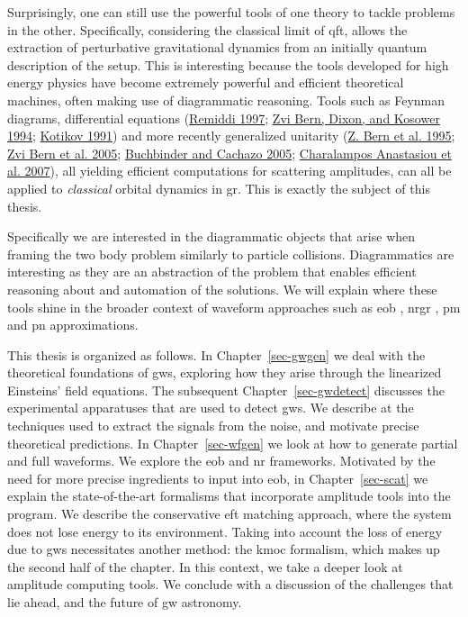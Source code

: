 \documentclass[
  11pt,
  a4paper,
  DIV=11,
  numbers=noendperiod,
  oneside]{scrreprt}
\DeclareRobustCommand{\[}{\begin{equation}}
\DeclareRobustCommand{\]}{\end{equation}}
\begin{document}
Surprisingly, one can still use the powerful tools of one theory to
tackle problems in the other. Specifically, considering the classical
limit of \gls{qft}, allows the extraction of perturbative gravitational
dynamics from an initially quantum description of the setup. This is
interesting because the tools developed for high energy physics have
become extremely powerful and efficient theoretical machines, often
making use of diagrammatic reasoning. Tools such as Feynman diagrams,
differential equations (\protect\hyperlink{ref-Remiddi:1997ny}{Remiddi
1997}; \protect\hyperlink{ref-Bern:1993kr}{Zvi Bern, Dixon, and Kosower
1994}; \protect\hyperlink{ref-Kotikov:1990kg}{Kotikov 1991}) and more
recently generalized unitarity (\protect\hyperlink{ref-Bern:1994cg}{Z.
Bern et al. 1995}; \protect\hyperlink{ref-Bern:2004ky}{Zvi Bern et al.
2005}; \protect\hyperlink{ref-Buchbinder:2005wp}{Buchbinder and Cachazo
2005}; \protect\hyperlink{ref-Anastasiou:2006jv}{Charalampos Anastasiou
et al. 2007}), all yielding efficient computations for scattering
amplitudes, can all be applied to \emph{classical} orbital dynamics in
\gls{gr}. This is exactly the subject of this thesis.

Specifically we are interested in the diagrammatic objects that arise
when framing the two body problem similarly to particle collisions.
Diagrammatics are interesting as they are an abstraction of the problem
that enables efficient reasoning about and automation of the solutions.
We will explain where these tools shine in the broader context of
waveform approaches such as \gls{eob} , \gls{nrgr} , \gls{pm} and
\gls{pn} approximations.

This thesis is organized as follows. In Chapter~\ref{sec-gwgen} we deal
with the theoretical foundations of \glspl{gw}, exploring how they arise
through the linearized Einsteins' field equations. The subsequent
Chapter~\ref{sec-gwdetect} discusses the experimental apparatuses that
are used to detect \glspl{gw}. We describe at the techniques used to
extract the signals from the noise, and motivate precise theoretical
predictions. In Chapter~\ref{sec-wfgen} we look at how to generate
partial and full waveforms. We explore the \gls{eob} and \gls{nr}
frameworks. Motivated by the need for more precise ingredients to input
into \gls{eob}, in Chapter~\ref{sec-scat} we explain the
state-of-the-art formalisms that incorporate amplitude tools into the
program. We describe the conservative \gls{eft} matching approach, where
the system does not lose energy to its environment. Taking into account
the loss of energy due to \glspl{gw} necessitates another method: the
\gls{kmoc} formalism, which makes up the second half of the chapter. In
this context, we take a deeper look at amplitude computing tools. We
conclude with a discussion of the challenges that lie ahead, and the
future of \gls{gw} astronomy.
\end{document}
